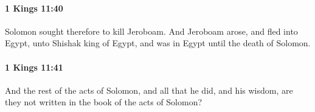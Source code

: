 		\paragraph{1 Kings 11:40} %
			\label{1KINGS-11-40}

			Solomon sought therefore to kill Jeroboam. And Jeroboam arose, and fled into Egypt, unto Shishak king of Egypt, and was in Egypt until the death of Solomon.


		\paragraph{1 Kings 11:41} %
			\label{1KINGS-11-41}

			And the rest of the acts of Solomon, and all that he did, and his wisdom, are they not written in the book of the acts of Solomon?


